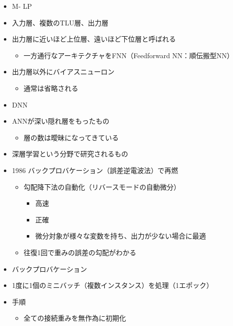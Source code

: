 \begin{itemize}
\tightlist
\item
  M- LP
\item
  入力層、複数のTLU層、出力層
\item
  出力層に近いほど上位層、遠いほど下位層と呼ばれる

  \begin{itemize}
  \tightlist
  \item
    一方通行なアーキテクチャをFNN（Feedforward NN：順伝搬型NN）
  \end{itemize}
\item
  出力層以外にバイアスニューロン

  \begin{itemize}
  \tightlist
  \item
    通常は省略される
  \end{itemize}
\item
  DNN
\item
  ANNが深い隠れ層をもったもの

  \begin{itemize}
  \tightlist
  \item
    層の数は曖昧になってきている
  \end{itemize}
\item
  深層学習という分野で研究されるもの
\item
  1986 バックプロバケーション（誤差逆電波法）で再燃

  \begin{itemize}
  \tightlist
  \item
    勾配降下法の自動化（リバースモードの自動微分）

    \begin{itemize}
    \tightlist
    \item
      高速
    \item
      正確
    \item
      微分対象が様々な変数を持ち、出力が少ない場合に最適
    \end{itemize}
  \item
    往復1回で重みの誤差の勾配がわかる
  \end{itemize}
\item
  バックプロバケーション
\item
  1度に1個のミニバッチ（複数インスタンス）を処理（1エポック）
\item
  手順

  \begin{itemize}
  \tightlist
  \item
    全ての接続重みを無作為に初期化


\end{itemize}
\end{itemize}
